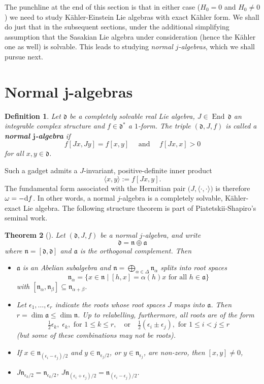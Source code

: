 \documentclass[12pt, twoside]{amsart}
\def\D{\textup{d}}
\def\d{\mathfrak{d}}
\def\n{\mathfrak{n}}
\def\a{\mathfrak{a}}
\DeclareMathOperator{\End}{\operatorname{End}\,}
\def\pint{\langle \cdotp,\cdotp \rangle }
\newtheorem{definition}{\bf Definition}[section]
\newtheorem{thm}[definition]{Theorem}
\theoremstyle{definition}
\begin{document}
The punchline at the end of this section is that in either case ($H_{0}=0$ and $H_{0} \neq 0$) we need to study K{\"a}hler-Einstein Lie algebras with exact K{\"a}hler form. We shall do just that in the subsequent sections, under the additional simplifying assumption that the Sasakian Lie algebra under consideration  (hence the K{\"a}hler one as well) is solvable. This leads to studying \textit{normal $j$-algebras}, which we shall pursue next.

\bigbreak 


\section{Normal \textnormal{j}-algebras}\label{sec:normal-j-algebras}

\begin{definition} \label{def= normal j-algebra}
Let  $\d$ be a completely solvable real Lie algebra, $J\in\End \d$ an integrable complex structure and $f\in\d^*$ a $1$-form. 
The triple $(\d, J, f)$ is called a {\bf normal $\boldsymbol j$-algebra} if 
$$f [Jx,Jy] =f [x,y] \quad \text{ and }\quad f [Jx, x] >0$$ for all  $x, y\in\d$.
\end{definition}
   
Such a gadget admits a $J$-invariant, positive-definite inner product
\[ \langle x ,y \rangle := f [Jx, y]. \]
The fundamental form associated with the Hermitian pair  $\big(J, \pint\big)$   
is therefore $\omega = -\D f$. 
In other words, a normal $j$-algebra is a  completely solvable, K{\"a}hler-exact  Lie algebra. The following structure theorem is part of Piatetskii-Shapiro's seminal work.
%
\begin{thm}[\cite{shapiro}]\label{prop raices}
Let  $(\d, J, f)$ be a normal $j$-algebra, and write 
$$\d =\n \oplus \a$$ 
where $\n=[\d, \d]$ and $\a$ is the orthogonal complement. Then
\begin{itemize}
    \item $\a$ is an Abelian subalgebra and $\n=\displaystyle\bigoplus_{\alpha\in \Delta} \n_\alpha$ splits into root spaces
    \[ \n_{\alpha}=\{x \in \n \mid [h, x]=\alpha(h)x  \text{ for all } h \in \a \}\] 
with $[\n_{\alpha}, \n_{\beta}] \subseteq \n_{\alpha + \beta}$. 
    \item Let $\epsilon_1 , \ldots,  \epsilon_r$ indicate the roots whose root spaces $J$ maps into $\a$. 
    Then $r=\dim \a\leq \dim \n$. Up to relabelling, furthermore, all roots are of the form
$$\tfrac{1}{2} \epsilon_k, \; \epsilon_k, \text{ for } 1 \leq k \leq r,  
\quad \text{or} \quad 
 \tfrac{1}{2} ( \epsilon_{i} \pm \epsilon_{j}), \text{ for } 1 \leq i <j \leq r$$
(but some of these combinations may not be roots). 
\item If $ x \in \n_{(\epsilon_{i} - \epsilon_{j})/2}$ and $ y \in \n_{\epsilon_j/2}$, or 
$ y \in \n_{\epsilon_j}$, are non-zero, then  $[x,y]\neq 0$,
\item $J\n_{\epsilon_k/2}=\n_{\epsilon_k/2}$, \; $J\n_{(\epsilon_{i} + \epsilon_{j})/2}=\n_{(\epsilon_{i} - \epsilon_{j})/2}$.
\end{itemize}
\end{thm}
\end{document}

